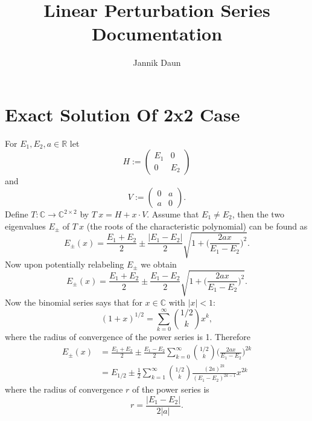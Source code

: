 \documentclass[11pt]{article}
\title{Linear Perturbation Series Documentation}
\author{Jannik Daun}
\begin{document}
\maketitle
\tableofcontents

\section{Exact Solution Of 2x2 Case}

For $E_1, E_2, a \in \mathbb{R}$
let
$$H:=
\begin{pmatrix}
E_1 & 0 \\
0 & E_2
\end{pmatrix}$$
and
$$
V :=
\begin{pmatrix}
0 & a \\
a & 0
\end{pmatrix}.
$$
Define $T: \mathbb{C} \to \mathbb{C}^{2 \times 2}$
by $T \ x =  H + x \cdot V$.
Assume that $E_1 \neq E_2$, then
the two eigenvalues $E_\pm$ of $T \  x$ (the roots of the characteristic polynomial) can be found as
\begin{equation}
   E_\pm (x) =  \frac{E_{1}+ E_2}{2}
   \pm \frac{|E_1 -E_2|}{2} \sqrt{
    1 + \bigg(\frac{2 a x}{E_1-E_2}\bigg)^2
   }.
\end{equation}
Now upon potentially relabeling $E_\pm$ we obtain
\begin{equation}
    E_\pm (x) =  \frac{E_{1}+ E_2}{2}
    \pm \frac{E_1 -E_2}{2} \sqrt{
     1 + \bigg(\frac{2 a x}{E_1-E_2}\bigg)^2
    }.
 \end{equation}
Now the binomial series says that for $x \in \mathbb{C}$ with $|x|<1$:
\begin{equation}
    (1+x)^{1/2} = \sum_{k=0}^\infty
    {1/2 \choose k} x^k,
\end{equation}
where the radius of convergence of the power series is 1.
Therefore
\begin{equation}
    \begin{split}
        E_\pm (x) &=  \frac{E_{1}+ E_2}{2}
   \pm \frac{E_1 -E_2}{2} \sum_{k=0}^\infty
   {1/2 \choose k} \bigg(\frac{2 a x}{E_1-E_2}\bigg)^{2k} \\
   &= E_{1/2} \pm \frac{1}{2} \sum_{k=1}^\infty
   {1/2 \choose k} \frac{(2 a)^{2k}}{(E_1-E_2)^{2k-1}} x^{2k}
    \end{split}
\end{equation}
where the radius of convergence $r$ of the power series is
\begin{equation}
    r = \frac{|E_1 -E_2|}{2 |a|} .
\end{equation}
\end{document}
